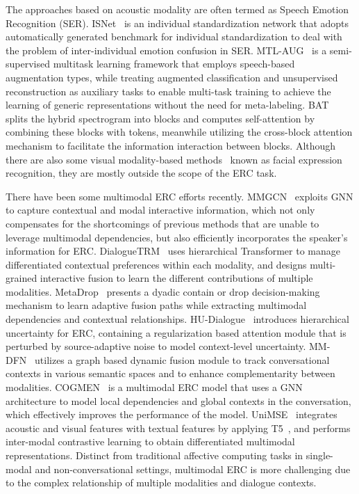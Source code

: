 \documentclass[journal]{IEEEtran}
\begin{document}
The approaches based on acoustic modality are often termed as Speech Emotion Recognition (SER). ISNet~\cite{fan2022isnet} is an individual standardization network that adopts automatically generated benchmark for individual standardization to deal with the problem of inter-individual emotion confusion in SER. MTL-AUG~\cite{latif2022multitask} is a semi-supervised multitask learning framework that employs speech-based augmentation types, while treating augmented classification and unsupervised reconstruction as auxiliary tasks to enable multi-task training to achieve the learning of generic representations without the need for meta-labeling. BAT~\cite{lei2022bat} splits the hybrid spectrogram into blocks and computes self-attention by combining these blocks with tokens, meanwhile utilizing the cross-block attention mechanism to facilitate the information interaction between blocks. Although there are also some visual modality-based methods~\cite{xu2022mdan,zhu2017dependency,she2020wscnet} known as facial expression recognition, they are mostly outside the scope of the ERC task.

There have been some multimodal ERC efforts recently. 
MMGCN~\cite{hu2021mmgcn} exploits GNN to capture contextual and modal interactive information, which not only compensates for the shortcomings of previous methods that are unable to leverage multimodal dependencies, but also efficiently incorporates the speaker's information for ERC.
DialogueTRM~\cite{mao2021dialoguetrm} uses hierarchical Transformer to manage differentiated contextual preferences within each modality, and designs multi-grained interactive fusion to learn the different contributions of multiple modalities.
MetaDrop~\cite{chen2021learning} presents a dyadic contain or drop decision-making mechanism to learn adaptive fusion paths while extracting multimodal dependencies and contextual relationships.
HU-Dialogue~\cite{chen2022modeling} introduces hierarchical uncertainty for ERC, containing a regularization based attention module that is perturbed by source-adaptive noise to model context-level uncertainty.
MM-DFN~\cite{hu2022mmdfn} utilizes a graph based dynamic fusion module to track conversational contexts in various semantic spaces and to enhance complementarity between modalities.
COGMEN~\cite{joshi2022cogmen} is a multimodal ERC model that uses a GNN architecture to model local dependencies and global contexts in the conversation, which effectively improves the performance of the model.
UniMSE~\cite{hu2022unimse} integrates acoustic and visual features with textual features by applying T5~\cite{raffel2020exploring}, and performs inter-modal contrastive learning to obtain differentiated multimodal representations. 
Distinct from traditional affective computing tasks in single-modal and non-conversational settings, multimodal ERC is more challenging due to the complex relationship of multiple modalities and dialogue contexts.
\end{document}
